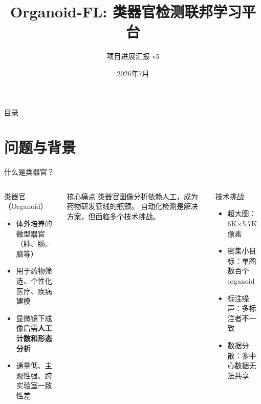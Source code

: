 \documentclass[aspectratio=169, 10pt]{beamer}
\title[Organoid-FL]{Organoid-FL: 类器官检测联邦学习平台}
\subtitle{项目进展汇报 v5}
\date{2026年7月}
\begin{document}
\begin{frame}[plain]
  \titlepage
\end{frame}

\begin{frame}{目录}
  \tableofcontents
\end{frame}

\section{问题与背景}

\begin{frame}{什么是类器官？}
  \begin{columns}[T]
    \begin{block}{类器官（Organoid）}
      \begin{itemize}
        \item 体外培养的微型器官（肺、肠、脑等）
        \item 用于药物筛选、个性化医疗、疾病建模
        \item 显微镜下成像后需\textbf{人工计数和形态分析}
        \item 通量低、主观性强、跨实验室一致性差
      \end{itemize}
    \end{block}
    \vspace{0em}
    \begin{alertblock}{核心痛点}
      类器官图像分析依赖人工，成为药物研发管线的瓶颈。
      自动化检测是解决方案，但面临多个技术挑战。
    \end{alertblock}
    \begin{block}{技术挑战}
      \begin{itemize}
        \item \alert{超大图}：6K$\times$5.7K 像素
        \item \alert{密集小目标}：单图数百个 organoid
        \item \alert{标注噪声}：多标注者不一致
        \item \alert{数据分散}：多中心数据无法共享
      \end{itemize}
    \end{block}
  \end{columns}
\end{frame}
\end{document}
